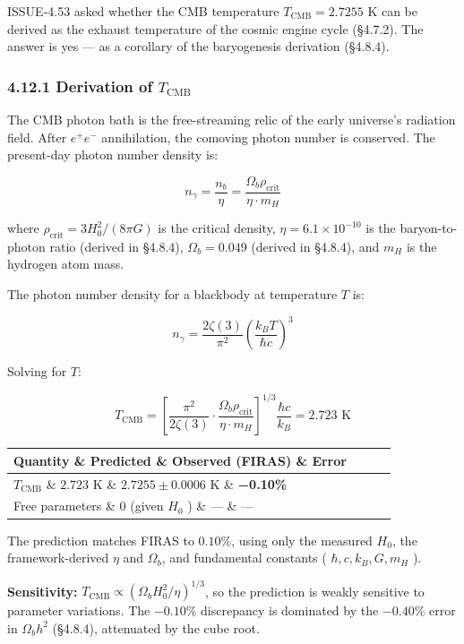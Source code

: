 \documentclass[11pt,a4paper]{article}
\theoremstyle{definition}\newtheorem{definition}{Definition}
\theoremstyle{remark}\newtheorem{remark}{Remark}
\begin{document}
ISSUE-4.53 asked whether the CMB temperature $T_{\text{CMB}} = 2.7255$ K can be derived as the exhaust temperature of the cosmic engine cycle (§4.7.2). The answer is yes — as a corollary of the baryogenesis derivation (§4.8.4).
\subsubsection{4.12.1 Derivation of $T_{\text{CMB}}$}

The CMB photon bath is the free-streaming relic of the early universe's radiation field. After $e^+ e^-$ annihilation, the comoving photon number is conserved. The present-day photon number density is:


\begin{equation}
n_\gamma = \frac{n_b}{\eta} = \frac{\Omega_b \rho_{\text{crit}}}{\eta \cdot m_H}
\end{equation}


where $\rho_{\text{crit}} = 3H_0^2/(8\pi G)$ is the critical density, $\eta = 6.1 \times 10^{-10}$ is the baryon-to-photon ratio (derived in §4.8.4), $\Omega_b = 0.049$ (derived in §4.8.4), and $m_H$ is the hydrogen atom mass.

The photon number density for a blackbody at temperature $T$ is:


\begin{equation}
n_\gamma = \frac{2\zeta(3)}{\pi^2}\left(\frac{k_B T}{\hbar c}\right)^3
\end{equation}


Solving for $T$:


\begin{equation}
\boxed{T_{\text{CMB}} = \left[\frac{\pi^2}{2\zeta(3)} \cdot \frac{\Omega_b \rho_{\text{crit}}}{\eta \cdot m_H}\right]^{1/3} \frac{\hbar c}{k_B} = 2.723 \text{ K}}
\end{equation}


\begin{longtable}{llll}
\hline
Quantity \& Predicted \& Observed (FIRAS) \& Error \\
\hline
$T_{\text{CMB}}$ \& $2.723$ K \& $2.7255 \pm 0.0006$ K \& \textbf{−0.10\%} \\
Free parameters \& 0 (given $H_0$ ) \& — \& — \\
\hline
\end{longtable}
The prediction matches FIRAS to $0.10\%$, using only the measured $H_0$, the framework-derived $\eta$ and $\Omega_b$, and fundamental constants ( $\hbar, c, k_B, G, m_H$ ).

\textbf{Sensitivity:} $T_{\text{CMB}} \propto (\Omega_b H_0^2 / \eta)^{1/3}$, so the prediction is weakly sensitive to parameter variations. The $-0.10\%$ discrepancy is dominated by the $-0.40\%$ error in $\Omega_b h^2$ (§4.8.4), attenuated by the cube root.
\end{document}
